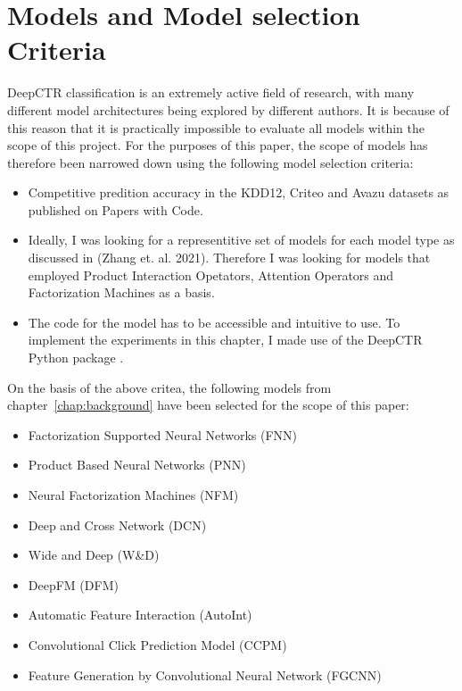 \documentclass{mldsmsc}
\begin{document}
\section{Models and Model selection Criteria}
\label{sec:model-selection}

DeepCTR classification is an extremely active field of research, with many
different model architectures being explored by different authors. It is because of this
reason that it is practically impossible to evaluate all models within the scope
of this project. For the purposes of this paper, the scope of models has therefore
been narrowed down using the following model selection criteria:

\begin{itemize}
\item Competitive predition accuracy in the KDD12, Criteo and Avazu datasets as published on Papers with Code.
\item Ideally, I was looking for a representitive set of models for each model type as discussed in (Zhang et. al. 2021). Therefore I was looking for models that employed Product Interaction Opetators, Attention Operators and Factorization Machines as a basis.
\item The code for the model has to be accessible and intuitive to use. To implement the experiments
in this chapter, I made use of the DeepCTR Python package \citep{RefWorks:shen2017deepctr:}.
\end{itemize}

On the basis of the above critea, the following models from chapter~\ref{chap:background} have been selected for the scope of this paper:

\begin{itemize}
\item Factorization Supported Neural Networks (FNN) \citep{RefWorks:zhang2016deep}
\item Product Based Neural Networks (PNN) \citep{RefWorks:qu2016product-based}
\item Neural Factorization Machines (NFM) \citep{RefWorks:he2017neural}
\item Deep and Cross Network (DCN) \citep{RefWorks:wang2017deep}
\item Wide and Deep (W\&D) \citep{RefWorks:cheng2016wide}
\item DeepFM (DFM) \citep{RefWorks:guo2017deepfm:}
\item Automatic Feature Interaction (AutoInt) \citep{RefWorks:song2019autoint}
\item Convolutional Click Prediction Model (CCPM) \citep{RefWorks:liu2015convolutional}
\item Feature Generation by Convolutional Neural Network (FGCNN) \citep{RefWorks:liu2019feature}
\end{itemize}
\end{document}
